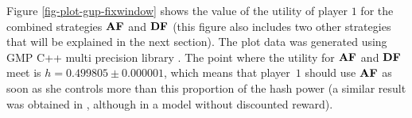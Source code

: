 \documentclass[a4paper,english,cleveref, autoref,numberwithinsect]{lipics-v2019}
\newcommand{\bdf}{\text{\rm {\bf DF}}}
\newcommand{\baf}{\text{\rm {\bf AF}}}
\begin{document}
Figure \ref{fig-plot-gup-fixwindow} shows the value of the utility of player $1$ for the combined strategies $\baf$ and $\bdf$ (this figure also includes two other strategies that will be explained in the next section). The plot data was generated using GMP C++ multi precision library \cite{gmp}. The point where the utility for $\baf$ and $\bdf$ meet is $h = 0.499805 \pm 0.000001$, which means that player~$1$ should use $\baf$ as soon as she controls more than this proportion of the hash power  (a similar result was obtained in \cite{mininggames:2016},  although in a model without discounted reward). 


\end{document}
